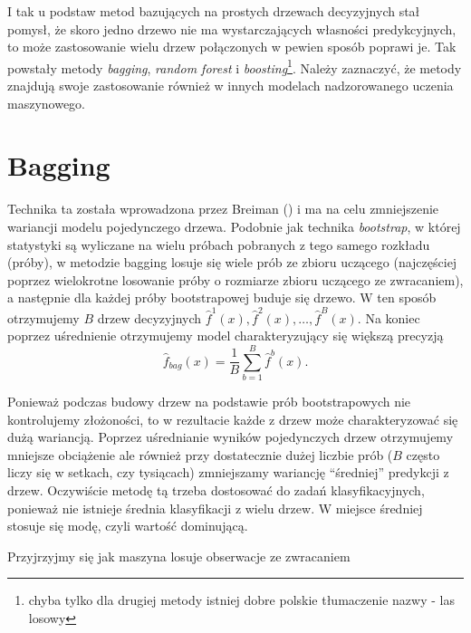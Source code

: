 \documentclass[
]{book}
\theoremstyle{plain}
\theoremstyle{definition}
\theoremstyle{definition}
\theoremstyle{definition}
\theoremstyle{definition}
\theoremstyle{definition}
\theoremstyle{remark}
\begin{document}
I tak u podstaw metod bazujących na prostych drzewach decyzyjnych stał pomysł, że skoro jedno drzewo nie ma wystarczających własności predykcyjnych, to może zastosowanie wielu drzew połączonych w pewien sposób poprawi je. Tak powstały metody \emph{bagging}, \emph{random forest} i \emph{boosting}\footnote{chyba tylko dla drugiej metody istniej dobre polskie tłumaczenie nazwy - las losowy}. Należy zaznaczyć, że metody znajdują swoje zastosowanie również w innych modelach nadzorowanego uczenia maszynowego.

\section{Bagging}\label{bagging}

Technika ta została wprowadzona przez Breiman () i ma na celu zmniejszenie wariancji modelu pojedynczego drzewa. Podobnie jak technika \emph{bootstrap}, w której statystyki są wyliczane na wielu próbach pobranych z tego samego rozkładu (próby), w metodzie bagging losuje się wiele prób ze zbioru uczącego (najczęściej poprzez wielokrotne losowanie próby o rozmiarze zbioru uczącego ze zwracaniem), a następnie dla każdej próby bootstrapowej buduje się drzewo. W ten sposób otrzymujemy \(B\) drzew decyzyjnych \(\hat{f}^1(x), \hat{f}^2(x),\ldots, \hat{f}^B(x)\). Na koniec poprzez uśrednienie otrzymujemy model charakteryzujący się większą precyzją
\begin{equation}
    \hat{f}_{bag}(x)=\frac1B\sum_{b=1}^B\hat{f}^b(x).
\end{equation}

Ponieważ podczas budowy drzew na podstawie prób bootstrapowych nie kontrolujemy złożoności, to w rezultacie każde z drzew może charakteryzować się dużą wariancją. Poprzez uśrednianie wyników pojedynczych drzew otrzymujemy mniejsze obciążenie ale również przy dostatecznie dużej liczbie prób (\(B\) często liczy się w setkach, czy tysiącach) zmniejszamy wariancję ``średniej'' predykcji z drzew. Oczywiście metodę tą trzeba dostosować do zadań klasyfikacyjnych, ponieważ nie istnieje średnia klasyfikacji z wielu drzew. W miejsce średniej stosuje się modę, czyli wartość dominującą.

Przyjrzyjmy się jak maszyna losuje obserwacje ze zwracaniem
\end{document}
